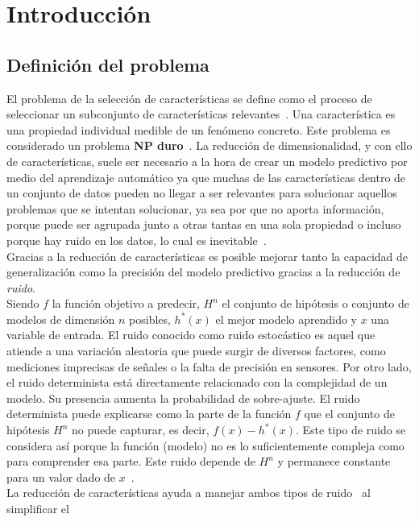 \chapter{Introducción}
\section{Definición del problema}\label{def_problem}
El problema de la selección de características se define como el proceso de
seleccionar un subconjunto de características relevantes~\cite{miao_survey_2016}. Una característica es
una propiedad individual medible de un fenómeno concreto. Este problema es
considerado un problema \textbf{NP duro}~\cite{leeuwen_algorithms_1998,johnjeffery_automata}. La reducción de dimensionalidad, y con
ello de características, suele ser necesario a la hora de crear un modelo predictivo por medio
del aprendizaje automático ya que muchas de las características
dentro de un conjunto de datos pueden no llegar a ser relevantes para solucionar
aquellos problemas que se intentan solucionar, ya sea por que no aporta información,
porque puede ser agrupada junto a otras tantas en una sola propiedad o incluso porque hay ruido
en los datos, lo cual es inevitable~\cite{Mostafa2012}.\\[6pt]
Gracias a la reducción de características es posible mejorar tanto la capacidad de generalización
como la precisión del modelo predictivo gracias a la reducción de \textit{ruido}.\\[6pt]
Siendo $f$ la función objetivo a predecir, $H^n$ el conjunto de hipótesis o conjunto de modelos
de dimensión $n$ posibles, $h^*(x)$ el mejor modelo aprendido y $x$ una variable de entrada. El ruido conocido
como ruido estocástico es aquel que atiende a una variación aleatoria que
puede surgir de diversos factores, como mediciones imprecisas de señales o la falta de
precisión en sensores. Por otro lado, el ruido determinista está directamente
relacionado con la complejidad de un modelo. Su presencia aumenta la probabilidad de
sobre-ajuste. El ruido determinista puede explicarse como la parte de la función $f$ que el conjunto
de hipótesis $H^n$ no puede capturar, es decir, $f(x) - h^*(x)$. Este tipo de ruido se
considera así porque la función (modelo) no es lo suficientemente compleja como para comprender
esa parte. Este ruido depende de $H^n$ y permanece constante para un valor dado de $x$~\cite{Mostafa2012}.\\[6pt]
La reducción de características ayuda a manejar ambos tipos de ruido~\cite{miao_survey_2016,Mostafa2012} al simplificar el
